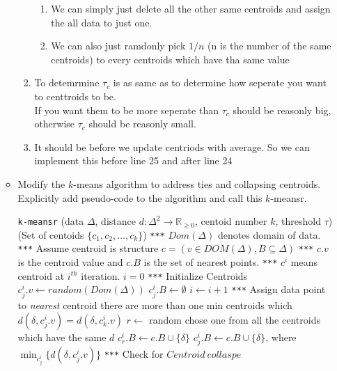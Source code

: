 \documentclass{article}
\begin{document}
\begin{enumerate}
\begin{itemize}
\begin{enumerate}
\begin{enumerate}
		\item We can simply just delete all the other same centroids and assign the all data to just one.
		\item We can also just ramdonly pick $1/n$ (n is the number of the same centroids) to every centroids which have tha same value
	\end{enumerate}
	\item To detemrmine $\tau_c$ is as same as to determine how seperate you want to centtroids to be.\\
	If you want them to be more seperate than $\tau_c$  should be reasonly big, otherwise $\tau_c$  should be reasonly small.\\
	\item It should be  before we update centriods with average. So we can implement this before line 25 and after line 24
\end{enumerate}
\item Modify the $k$-means algorithm to address ties and collapsing centroids.  Explicitly add pseudo-code to the algorithm and call this $k$-meansr. 
{\small
	\begin{center}
		\begin{algorithmic}[1]\label{kmeansr}
			 \texttt{k-meansr}
			 (\textsf{data} $\Delta$, distance $d:\Delta^2\rightarrow \mathbb{R}_{\geq 0}$, \textsf{centoid number} $k$, \textsf{threshold} $\tau$)
			 (\textsf{Set of centoids} $\{c_1, c_2, \ldots, c_k\}$)
			\State
			\State \texttt{***} $Dom(\Delta)$ denotes domain of data.
			\State
			\State \texttt{***} Assume centroid is structure $c = (v \in DOM(\Delta), B\subseteq \Delta)$
			\State  \texttt{***} $c.v$ is the centroid value and $c.B$ is the set of nearest points.
			\State \texttt{***}  $c^{i}$ means centroid at $i^{th}$ iteration. 
			\State
			\State $i = 0$
			\State \texttt{***} Initialize Centroids
			\State $c_j^i.v \gets  random(Dom(\Delta))$
			\State $c_j^i.B \gets \emptyset$
			\EndFor
			\State
			\Repeat
			\State $i \gets i + 1$
			\State \texttt{***} Assign data point to {\it nearest} centroid
			\For {$\delta \in \Delta$}
			\If there are more than one min centroids which $d(\delta, c_j^i.v) = d(\delta, c_k^i.v)$
			\State $r \gets$ random chose one from all the centroids which have the same $d$
			\State $c_r^i.B \gets c.B \cup \{\delta\}$
			\Else
			\State $c_j^i.B \gets c.B \cup \{\delta\}$, where $\min_{c_j^i}\{d(\delta, c_j^i.v)\}$
			\EndIf
			\EndFor
			\State \texttt{***} Check for $Centroid \ collaspe$

\end{algorithmic}
\end{center}}
\end{itemize}
\end{enumerate}
\end{document}
